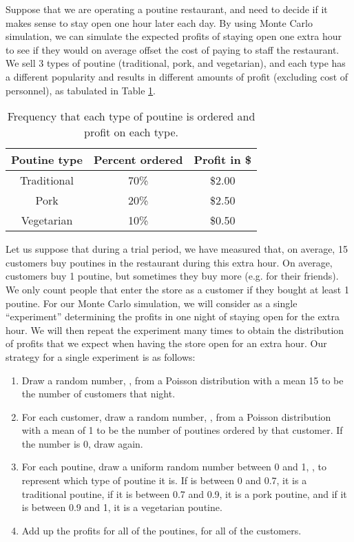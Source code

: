 Suppose that we are operating a poutine restaurant, and need to decide if it makes sense to stay open one hour later each day. By using Monte Carlo simulation, we can simulate the expected profits of staying open one extra hour to see if they would on average offset the cost of paying to staff the restaurant. We sell 3 types of poutine (traditional, pork, and vegetarian), and each type has a different popularity and results in different amounts of profit (excluding cost of personnel), as tabulated in Table \ref{tab:poutineProfits}.
\begin{table}[h!]
\center
\begin{tabular}{|c|c|c|}
\hline
\textbf{Poutine type} & \textbf{Percent ordered} & \textbf{Profit in \$}\\
\hline
Traditional & 70\% & \$2.00\\
Pork & 20\% & \$2.50\\
Vegetarian & 10\% & \$0.50\\
\hline
\end{tabular}
\caption{\label{tab:poutineProfits} Frequency that each type of poutine is ordered and profit on each type.}
\end{table}

Let us suppose that during a trial period, we have measured that, on average, 15 customers buy poutines in the restaurant during this extra hour. On average, customers buy 1 poutine, but sometimes they buy more (e.g. for their friends). We only count people that enter the store as a customer if they bought at least 1 poutine. For our Monte Carlo simulation, we will consider as a single ``experiment'' determining the profits in one night of staying open for the extra hour. We will then repeat the experiment many times to obtain the distribution of profits that we expect when having the store open for an extra hour. Our strategy for a single experiment is as follows:
\begin{enumerate}
\item Draw a random number, , from a Poisson distribution with a mean 15 to be the number of customers that night.
\item For each customer, draw a random number, , from a Poisson distribution with a mean of 1 to be the number of poutines ordered by that customer. If the number is 0, draw again. 
\item For each poutine, draw a uniform random number between 0 and 1, , to represent which type of poutine it is. If  is between 0 and 0.7, it is a traditional poutine, if it is between 0.7 and 0.9, it is a pork poutine, and if it is between 0.9 and 1, it is a vegetarian poutine.
\item Add up the profits for all of the poutines, for all of the customers.
\end{enumerate}

